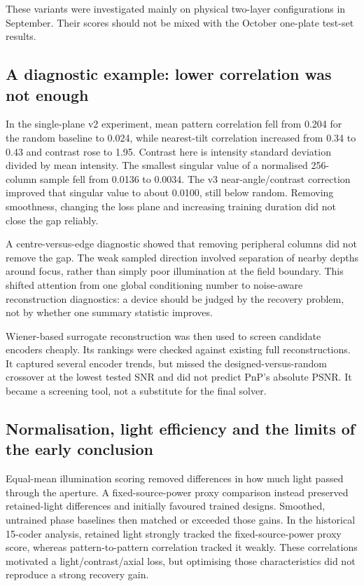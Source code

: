 These variants were investigated mainly on physical two-layer configurations in September. Their scores should not be mixed with the October one-plate test-set results.

\subsection{A diagnostic example: lower correlation was not enough}

In the single-plane v2 experiment, mean pattern correlation fell from 0.204 for the random baseline to 0.024, while nearest-tilt correlation increased from 0.34 to 0.43 and contrast rose to 1.95. Contrast here is intensity standard deviation divided by mean intensity. The smallest singular value of a normalised 256-column sample fell from 0.0136 to 0.0034. The v3 near-angle/contrast correction improved that singular value to about 0.0100, still below random. Removing smoothness, changing the loss plane and increasing training duration did not close the gap reliably.

A centre-versus-edge diagnostic showed that removing peripheral columns did not remove the gap. The weak sampled direction involved separation of nearby depths around focus, rather than simply poor illumination at the field boundary. This shifted attention from one global conditioning number to noise-aware reconstruction diagnostics: a device should be judged by the recovery problem, not by whether one summary statistic improves.

Wiener-based surrogate reconstruction was then used to screen candidate encoders cheaply. Its rankings were checked against existing full reconstructions. It captured several encoder trends, but missed the designed-versus-random crossover at the lowest tested SNR and did not predict PnP's absolute PSNR. It became a screening tool, not a substitute for the final solver.

\subsection{Normalisation, light efficiency and the limits of the early conclusion}

Equal-mean illumination scoring removed differences in how much light passed through the aperture. A fixed-source-power proxy comparison instead preserved retained-light differences and initially favoured trained designs. Smoothed, untrained phase baselines then matched or exceeded those gains. In the historical 15-coder analysis, retained light strongly tracked the fixed-source-power proxy score, whereas pattern-to-pattern correlation tracked it weakly. These correlations motivated a light/contrast/axial loss, but optimising those characteristics did not reproduce a strong recovery gain.

